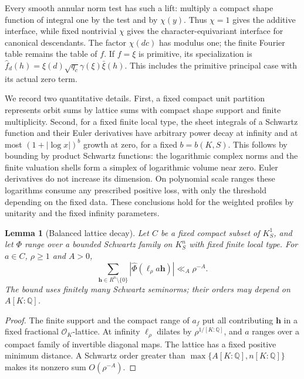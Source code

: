 \documentclass[11pt,a4paper]{article}
\numberwithin{equation}{section}
\newtheorem{lemma}[theorem]{Lemma}
\theoremstyle{definition}
\theoremstyle{remark}
\begin{document}
Every smooth annular norm test has such a lift: multiply a compact shape
function of integral one by the test and by $\chi(y)$.  Thus $\chi=1$
gives the additive interface, while fixed nontrivial $\chi$ gives the
character-equivariant interface for canonical descendants.  The factor
$\chi(dc)$ has modulus one; the finite Fourier table remains the table
of $f$.  If $f=\xi$ is primitive, its specialization is
$\widehat f_d(h)=\xi(d)\sqrt{q_c}\gamma(\xi)\bar\xi(h)$.
This includes the primitive principal case with its actual zero term.

We record two quantitative details.  First, a fixed compact unit
partition represents orbit sums by lattice sums with compact shape
support and finite multiplicity.
Second, for a fixed finite local type, the sheet integrals of a
Schwartz function and their Euler derivatives have arbitrary power
decay at infinity and at most $(1+|\log x|)^b$ growth at zero, for a
fixed $b=b(K,S)$.  This follows by bounding by product Schwartz functions:
the logarithmic complex norms and the finite valuation shells form a
simplex of logarithmic volume near zero.  Euler derivatives do not
increase its dimension.  On polynomial scale ranges these logarithms
consume any prescribed positive loss, with only the threshold depending
on the fixed data.  These conclusions hold for the weighted profiles
by unitarity and the fixed infinity parameters.

\begin{lemma}[Balanced lattice decay]\label{lem:balanced-lattice-decay}
Let $C$ be a fixed compact subset of $K_S^1$, and let $\Phi$ range over a
bounded Schwartz family on $K_S^n$ with fixed finite local type.  For
$a\in C$, $\rho\ge1$ and $A>0$,
\begin{equation}\label{eq:balanced-lattice-decay}
 \sum_{\mathbf h\in R^n\setminus\{0\}}
       |\widehat\Phi(\ell_\rho a\mathbf h)|\ll_A\rho^{-A}.
\end{equation}
The bound uses finitely many Schwartz seminorms; their orders may depend
on $A[K:\mathbb Q]$.
\end{lemma}
\begin{proof}
The finite support and the compact range of $a_f$ put all contributing
$\mathbf h$ in a fixed fractional $\mathcal O_K$-lattice.  At infinity
$\ell_\rho$ dilates by $\rho^{1/[K:\mathbb Q]}$, and $a$ ranges over a
compact family of invertible diagonal maps.  The lattice has a fixed
positive minimum distance.  A Schwartz order greater than
$\max\{A[K:\mathbb Q],n[K:\mathbb Q]\}$ makes its nonzero sum
$O(\rho^{-A})$.
\end{proof}
\end{document}
